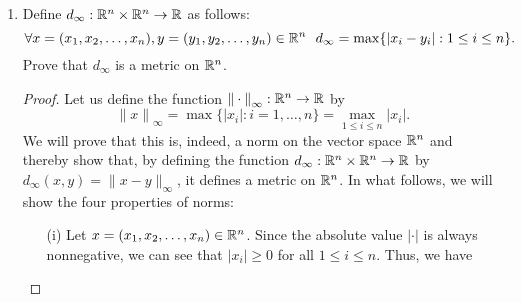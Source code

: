 \documentclass{article}
\begin{document}
\begin{enumerate}
\begin{proof}
\begin{enumerate}
\begin{align*}
                \end{align*}
                Thus, we see that property (iii) has been satisfied.
            \item[(iv)] Let \( x,y \in V  \). By using Minkowski's inequality, we see that
                \begin{align*}
                    \|x + y \|_p &= \Big(  \sum_{ i=1  }^{ n } | {x}_{i} + {y}_{i}  |^{p} \Big)^{\frac{ 1 }{ p } } \\
                                 &\leq \Big(  \sum_{ i=1  }^{ n } | {x}_{i} |^{p} \Big)^{\frac{ 1 }{ p } } + \Big(  \sum_{ i=1  }^{ n } | {y}_{i} |^{p} \Big)^{\frac{ 1 }{ p } } \\
                                 &= \|x\|_p + \|y\|_p.
                \end{align*}
                Thus, the triangle inequality property of norms is satisfied.
        \end{enumerate}
        This tells us that \( \|\cdot\|_p  \) is a norm on the vector space \( \R^{n} \). Defining the function \( {d}_{p}: \R^{n} \times \R^{n} \to \R  \) by \( {d}_{p}(x,y) = \|x - y \|_{p} \), we see that \( {d}_{p}  \) must be a metric on \( \R^{n} \) by Exercise 10.
    \end{proof}
\item Define \( {d}_{\infty } : \mathbb{R}^{n} \times \mathbb{R}^{n} \to \mathbb{R}  \) as follows:
    \[  \forall x = ({x}_{1}, {x}_{2}, \dots, {x}_{n}), y = ({y}_{1}, {y}_{2}, \dots, {y}_{n}) \in \mathbb{R}^{n} \ \ {d}_{\infty } = \max \{ | {x}_{i} - {y}_{i} | : 1 \leq i \leq n \}. \]
    Prove that \( {d}_{\infty }  \) is a metric on \( \R^{n} \).
    \begin{proof}
       Let us define the function \( {\|\cdot\|}_{\infty } : \mathbb{R}^{n} \to \mathbb{R}  \) by 
       \[  {\|x\|}_{\infty } = \max \{ | {x}_{i} | : i = 1, \dots, n \}  = \max_{1 \leq i \leq n} | {x}_{i} |. \]
       We will prove that this is, indeed, a norm on the vector space \( \R^{n} \) and thereby show that, by defining the function \( {d}_{\infty } : \mathbb{R}^{n} \times \mathbb{R}^{n} \to \mathbb{R}  \) by \( {d}_{\infty }(x,y) = \|x - y\|_{\infty } \), it defines a metric on \( \R^{n} \). In what follows, we will show the four properties of norms:
       \begin{enumerate}
           \item[(i)] Let \( x = ({x}_{1}, {x}_{2}, \dots, {x}_{n}) \in \mathbb{R}^{n} \). Since the absolute value \( | \cdot |  \) is always nonnegative, we can see that \( | {x}_{i} |  \geq 0  \) for all \( 1 \leq i \leq n  \). Thus, we have 

\end{enumerate}
\end{proof}
\end{enumerate}
\end{document}
